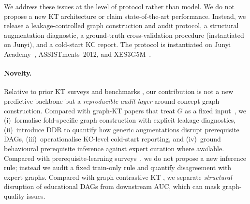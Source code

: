 \documentclass[pdflatex,sn-basic]{sn-jnl}
\newcommand{\DDR}{\textsc{DDR}}
\begin{document}
We address these issues at the level of protocol rather than model. We
do not propose a new KT architecture or claim state-of-the-art
performance. Instead, we release a leakage-controlled graph construction
and audit protocol, a structural augmentation diagnostic, a ground-truth
cross-validation procedure (instantiated on Junyi), and a cold-start KC
report. The protocol is instantiated on Junyi
Academy~\cite{junyi_dataset,chang2015junyi}, ASSISTments~2012, and
XES3G5M~\cite{xes3g5m2023}.

\paragraph{Novelty.}
Relative to prior KT surveys and benchmarks
\cite{abdelrahman2023kt_survey,liu2022pykt}, our contribution is not a
new predictive backbone but a \emph{reproducible audit layer} around
concept-graph construction. Compared with graph-KT papers that treat
$G$ as a fixed input~\cite{nakagawa2019gkt,tong2020skt,yang2021gikt,dygkt2024,dgekt2024}, we (i)~formalise fold-specific graph construction
with explicit leakage diagnostics, (ii)~introduce \DDR{} to quantify how
generic augmentations disrupt prerequisite DAGs, (iii)~operationalise
KC-level cold-start reporting, and (iv)~ground behavioural prerequisite
inference against expert curation where available. Compared with
prerequisite-learning surveys~\cite{bai2025survey,lin2016moocprereq,pan2020concept}, we do not propose a new inference rule; instead we
audit a fixed train-only rule and quantify disagreement with expert
graphs. Compared with graph contrastive KT
\cite{lee2022cl4kt,song2022biclkt}, we separate
\emph{structural} disruption of educational DAGs from downstream AUC,
which can mask graph-quality issues.
\end{document}
